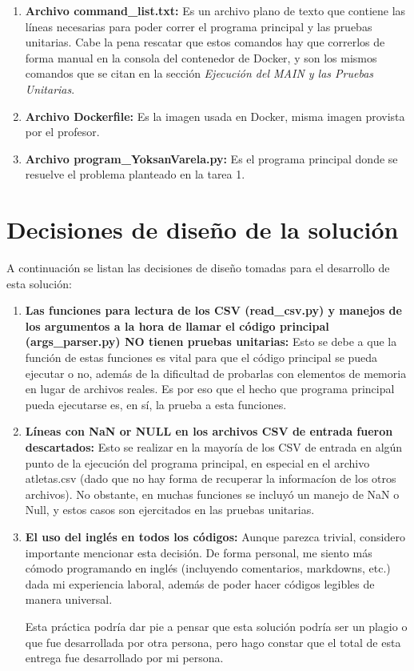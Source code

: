 \documentclass[a4paper]{article}
\begin{document}
\begin{enumerate}
    \item \textbf{Archivo command\_list.txt:} Es un archivo plano de texto que contiene las l\'{i}neas necesarias para poder correr el programa principal y las pruebas unitarias. Cabe la pena rescatar que estos comandos hay que correrlos de forma manual en la consola del contenedor de Docker, y son los mismos comandos que se citan en la secci\'{o}n \textit{Ejecuci\'{o}n del MAIN y las Pruebas Unitarias}.
    
    \item \textbf{Archivo Dockerfile:} Es la imagen usada en Docker, misma imagen provista por el profesor.
    
    \item \textbf{Archivo program\_YoksanVarela.py:} Es el programa principal donde se resuelve el problema planteado en la tarea 1.
    
\end{enumerate}

\section{Decisiones de dise\~{n}o de la soluci\'{o}n}
A continuaci\'{o}n se listan las decisiones de dise\~{n}o tomadas para el desarrollo de esta soluci\'{o}n:

\begin{enumerate}
    \item \textbf{Las funciones para lectura de los CSV (read\_csv.py) y manejos de los argumentos a la hora de llamar el c\'{o}digo principal (args\_parser.py) NO tienen pruebas unitarias:} Esto se debe a que la funci\'{o}n de estas funciones es vital para que el c\'{o}digo principal se pueda ejecutar o no, adem\'{a}s de la dificultad de probarlas con elementos de memoria en lugar de archivos reales. Es por eso que el hecho que programa principal pueda ejecutarse es, en s\'{i}, la prueba a esta funciones.

    \item \textbf{L\'{i}neas con NaN or NULL en los archivos CSV de entrada fueron descartados:} Esto se realizar en la mayor\'{i}a de los CSV de entrada en alg\'{u}n punto de la ejecuci\'{o}n del programa principal, en especial en el archivo atletas.csv (dado que no hay forma de recuperar la informac\'{i}on de los otros archivos). No obstante, en muchas funciones se incluy\'{o} un manejo de NaN o Null, y estos casos son ejercitados en las pruebas unitarias.
    
    \item \textbf{El uso del ingl\'{e}s en todos los c\'{o}digos:} Aunque parezca trivial, considero importante mencionar esta decisi\'{o}n. De forma personal, me siento m\'{a}s c\'{o}modo programando en ingl\'{e}s (incluyendo comentarios, markdowns, etc.) dada mi experiencia laboral, adem\'{a}s de poder hacer c\'{o}digos legibles de manera universal.

    Esta pr\'{a}ctica podr\'{i}a dar pie a pensar que esta soluci\'{o}n podr\'{i}a ser un plagio o que fue desarrollada por otra persona, pero hago constar que el total de esta entrega fue desarrollado por mi persona.
\end{enumerate}
\end{document}
